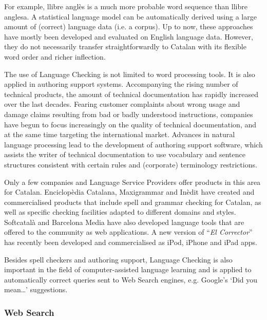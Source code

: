 \documentclass[]{../../metanetpaper}
\begin{document}
\begin{multicols}{2}
For example, llibre anglès is a much more probable word sequence than llibre anglesa. A statistical language model can be automatically derived using a large amount of (correct) language data (i.e. a corpus). Up to now, these approaches have mostly been developed and evaluated on English language data. However, they do not necessarily transfer straightforwardly to Catalan with its flexible word order and richer inflection. 

The use of Language Checking is not limited to word processing tools. It is also applied in authoring support systems. Accompanying the rising number of technical products, the amount of technical documentation has rapidly increased over the last decades. Fearing customer complaints about wrong usage and damage claims resulting from bad or badly understood instructions, companies have begun to focus increasingly on the quality of technical documentation, and at the same time targeting the international market. Advances in natural language processing lead to the development of authoring support software, which assists the writer of technical documentation to use vocabulary and sentence structures consistent with certain rules and (corporate) terminology restrictions.

Only a few companies and Language Service Providers offer products in this area for Catalan. Enciclopèdia Catalana, Maxigrammar and Inèdit have created and commercialised products that include spell and grammar checking for Catalan, as well as specific checking facilities adapted to different domains and styles. Softcatalà and Barcelona Media have also developed language tools that are offered to the community as web applications. A new version of “\textit{El Corrector}” has recently been developed and commercialised as iPod, iPhone and iPad apps. 

Besides spell checkers and authoring support, Language Checking is also important in the field of computer-assisted language learning and is applied to automatically correct queries sent to Web Search engines, e.g. Google’s ‘Did you mean…’ suggestions. 

\subsubsection{Web Search}


\end{multicols}
\end{document}
